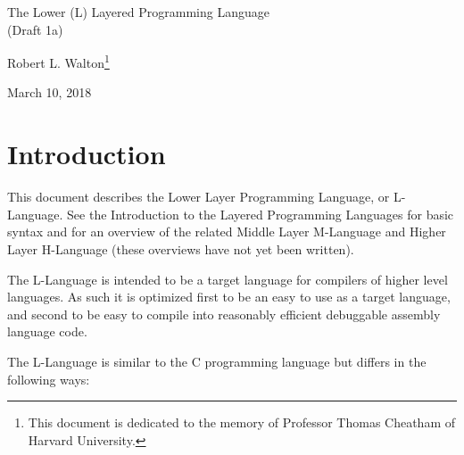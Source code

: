 \documentclass[12pt]{article}
\makeatletter
\renewcommand\tableofcontents{%
    \begin{list}{}%
	     {\setlength{\itemsep}{0in}%
	      \setlength{\topsep}{0in}%
	      \setlength{\parsep}{1ex}%
	      \setlength{\labelwidth}{0in}%
	      \setlength{\baselineskip}{1.5ex}%
	      \setlength{\leftmargin}{1.0in}%
	      \setlength{\rightmargin}{1.0in}}%
    \item\@starttoc{toc}%
    \end{list}}
\makeatother
\begin{document}
        
\begin{center}

{\Large
The Lower (L) Layered Programming Language \\[0.5ex]
(Draft 1a)}

\medskip

Robert L. Walton\footnote{This document is dedicated to the memory
of Professor Thomas Cheatham of Harvard University.}

March 10, 2018
 
\end{center}

{\small \tableofcontents}

\newpage

\section{Introduction}

This document describes the Lower Layer Programming Language, or
L-Language.  See the Introduction to the Layered
Programming Languages for basic syntax and for an overview of the related
Middle Layer M-Language and Higher Layer H-Language (these overviews
have not yet been written).

The L-Language is intended to be a target language for compilers of
higher level languages.  As such it is optimized first to be an easy to 
use as a target language, and second to be easy to
compile into reasonably efficient debuggable assembly language code.

The L-Language is similar to the C programming language
but differs in the following ways:
\end{document}

